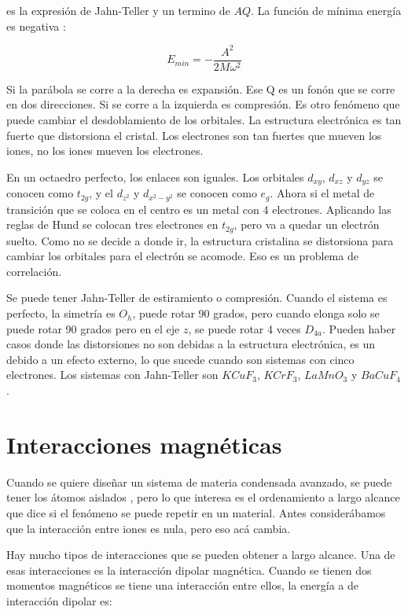 \documentclass[11pt,fleqn]{book}
\begin{document}
es la expresión de Jahn-Teller  y un termino de $AQ$. La función de mínima energía es negativa :

\begin{equation}
    E_{min}=-\frac{A^{2}}{2M\omega^{2}}
    \label{Eq. 4.6}
\end{equation}

Si la parábola se corre a la derecha es expansión. Ese Q es un fonón que se corre en dos direcciones. Si se corre a la izquierda es compresión. Es otro fenómeno que puede cambiar el desdoblamiento de los orbitales. La estructura electrónica es tan fuerte que distorsiona el cristal. Los electrones son tan fuertes que mueven los iones, no los iones mueven los electrones.

En un octaedro perfecto, los enlaces son iguales. Los orbitales $d_{xy}$, $d_{xz}$ y $d_{yz}$ se conocen como $t_{2g}$, y el $d_{z^{2}}$ y $d_{x^{2}-y^{2}}$ se conocen como $e_{g}$. Ahora si el metal de transición que se coloca en el centro es un metal con 4 electrones. Aplicando las reglas de Hund se colocan tres electrones en $t_{2g}$, pero va a quedar un electrón suelto. Como no se decide a donde ir, la estructura cristalina se distorsiona para cambiar los orbitales para el electrón se acomode. Eso es un problema de correlación.


Se puede tener Jahn-Teller de estiramiento o compresión. Cuando el sistema es perfecto, la simetría es $O_{h}$, puede rotar 90 grados, pero cuando elonga solo se puede rotar  90 grados pero en el eje $z$, se puede rotar 4 veces $D_{4a}$. Pueden haber casos donde las distorsiones no son debidas a la estructura electrónica, es un debido a un efecto externo, lo que sucede cuando son sistemas con cinco electrones. Los sistemas con Jahn-Teller son $KCuF_{3}$, $KCrF_{3}$, $LaMnO_{3}$ y $BaCuF_{4}$.



\chapter{Interacciones magnéticas}

Cuando se quiere diseñar un sistema de materia condensada avanzado, se puede tener los átomos aislados , pero lo que interesa es el ordenamiento a largo alcance que dice si el fenómeno se puede repetir en un material. Antes considerábamos que la interacción entre iones es nula, pero eso acá cambia.

Hay mucho tipos de interacciones que se pueden obtener a largo alcance. Una de esas interacciones es la interacción dipolar magnética. Cuando se tienen dos momentos magnéticos se tiene una interacción entre ellos, la energía a de interacción dipolar es:
\end{document}
